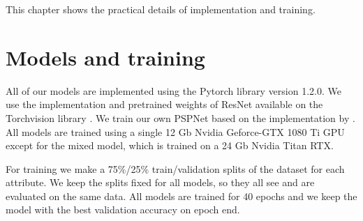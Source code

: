 This chapter shows the practical details of implementation and training.

\section{Models and training}
All of our models are implemented using the Pytorch library
\cite{paszke_pytorch} version 1.2.0.
We use the implementation and pretrained weights of ResNet
available on the Torchvision library \cite{marcel_torchvision}.
We train our own PSPNet based on the implementation by .
All models are trained using a single 12 Gb Nvidia Geforce-GTX 1080 Ti GPU except
for the mixed model, which is trained on a 24 Gb Nvidia Titan RTX.

For training we make a 75\%/25\% train/validation splits of the dataset for
each attribute. We keep the splits fixed for all models, so they all see
and are evaluated on the same data. All models are trained for 40 epochs
and we keep the model with the best validation accuracy on epoch end.

